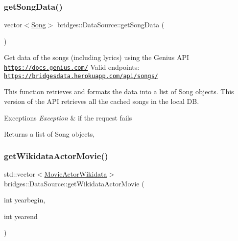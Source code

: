 \subsubsection{\texorpdfstring{get\+Song\+Data()}{getSongData()}}
{\footnotesize\ttfamily vector$<$\hyperlink{classbridges_1_1dataset_1_1_song}{Song}$>$ bridges\+::\+Data\+Source\+::get\+Song\+Data (\begin{DoxyParamCaption}{ }\end{DoxyParamCaption})\hspace{0.3cm}{\ttfamily [inline]}}

Get data of the songs (including lyrics) using the Genius A\+PI \href{https://docs.genius.com/}{\tt https\+://docs.\+genius.\+com/} Valid endpoints\+: \href{https://bridgesdata.herokuapp.com/api/songs/}{\tt https\+://bridgesdata.\+herokuapp.\+com/api/songs/}

This function retrieves and formats the data into a list of Song objects. This version of the A\+PI retrieves all the cached songs in the local DB.


\begin{DoxyExceptions}{Exceptions}
{\em Exception} & if the request fails\\
\hline
\end{DoxyExceptions}
\begin{DoxyReturn}{Returns}
a list of Song objects, 
\end{DoxyReturn}
\mbox{\label{classbridges_1_1_data_source_a25b33736b4ae9ffea5fe4ebf5dbb3a63}} 
\subsubsection{\texorpdfstring{get\+Wikidata\+Actor\+Movie()}{getWikidataActorMovie()}}
{\footnotesize\ttfamily std\+::vector$<$\hyperlink{classbridges_1_1dataset_1_1_movie_actor_wikidata}{Movie\+Actor\+Wikidata}$>$ bridges\+::\+Data\+Source\+::get\+Wikidata\+Actor\+Movie (\begin{DoxyParamCaption}\item[{int}]{yearbegin,  }\item[{int}]{yearend }\end{DoxyParamCaption})\hspace{0.3cm}{\ttfamily [inline]}}




